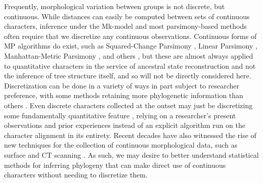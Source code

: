 \documentclass[10pt, twocolumn, twoside]{article}
\begin{document}
Frequently, morphological variation between groups is not discrete, but continuous. While distances can easily be computed between sets of continuous characters, inference under the Mk-model \citep{lewisLikelihoodApproachEstimating2001} and most parsimony-based methods \citep{goloboffContinuousCharactersAnalyzed2006} often require that we discretize any continuous observations. Continuous forms of MP algorithms do exist, such as Squared-Change Parsimony \citep{maddisonSquaredchangeParsimonyReconstructions1991, rohlfGeometricMorphometricsPhylogeny2002}, Linear Parsimony \citep{klugeQuantitativePhyleticsEvolution1969}, Manhattan-Metric Parsimony \citep{swoffordInferringEvolutionaryTrees1987}, and others \citep[see][]{rogersComparisonSuitabilityRogers1991}, but these are almost always applied to quantitative characters in the service of ancestral state reconstruction and not the inference of tree structure itself, and so will not be directly considered here. Discretization can be done in a variety of ways \citep{garcia-cruzCodingQuantitativeCharacter2006, thorpeCodingMorphometricCharacters1984} in part subject to researcher preference, with some methods retaining more phylogenetic information than others \citep{brazeauProblematicCharacterCoding2011, worthingtonSelectionCharacterCoding2017}. Even discrete characters collected at the outset may just be discretizing some fundamentally quantitative feature \citep{wiensCharacterAnalysisMorphological2001}, relying on a researcher's present observations and prior experiences instead of an explicit algorithm run on the character alignment in its entirety. Recent decades have also witnessed the rise of new techniques for the collection of continuous morphological data, such as surface and CT scanning \citep{mitteroeckerAdvancesGeometricMorphometrics2009, adamsFieldComesAge2013, reinGeometricMorphometricsVirtual2014}. As such, we may desire to better understand statistical methods for inferring phylogeny that can make direct use of continuous characters without needing to discretize them. 
\end{document}
